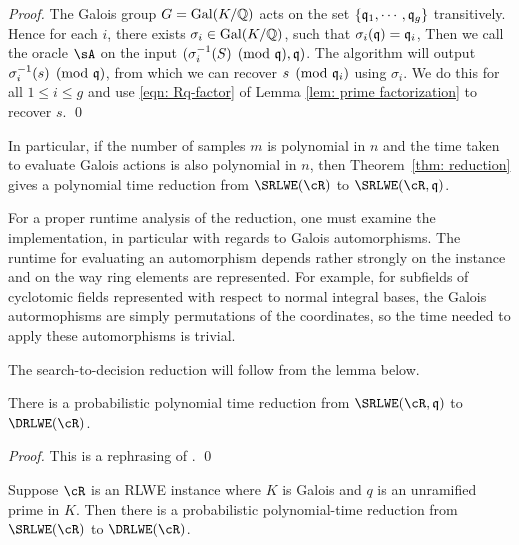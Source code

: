 \documentclass[envcountsect]{llncs}
\begin{document}
\begin{proof}
        The Galois group $G =\operatorname{Gal}(K/\mathbb{Q})$ acts on the set $\{\mathfrak{q}_1, \cdots ,\mathfrak{q}_g\}$ transitively. Hence for each $i$, there exists $\sigma_i \in \operatorname{Gal}(K/\mathbb{Q})$, such that $\sigma_i(\mathfrak{q}) = \mathfrak{q}_i$, Then we call the oracle $\sA$ on the input $(\sigma_i^{-1}(S) \pmod {\mathfrak{q}}, \mathfrak{q})$. The algorithm will output $\sigma_i^{-1}(s) \pmod{\mathfrak{q}}$, from which we can recover $s \pmod{\mathfrak{q}_i}$ using $\sigma_i$.  We do this for all $1\leq i \leq g$ and use \eqref{eqn: Rq-factor} of Lemma \ref{lem: prime factorization} to recover $s$. 
\qed \end{proof}

In particular, if the number of samples $m$ is polynomial in $n$ and the time taken to evaluate Galois actions is also polynomial in $n$, then Theorem~\ref{thm: reduction} gives a polynomial time reduction from $\SRLWE(\cR)$ to $\SRLWE(\cR,\fq)$. 

\begin{remark}
        For a proper runtime analysis of the reduction, one must examine the implementation, in particular with regards to Galois automorphisms.
The runtime for evaluating an automorphism depends
rather strongly on the instance and on the way ring elements are represented. For example, for subfields of cyclotomic fields represented with respect to normal integral bases, the Galois autormophisms are simply permutations of the coordinates, so the time needed to apply these automorphisms is trivial.
\end{remark}


The search-to-decision reduction will follow from the lemma below.
\begin{lemma}
There is a probabilistic polynomial time reduction from $\SRLWE(\cR,\fq)$ to $\DRLWE(\cR)$.
\end{lemma}

\begin{proof}
This is a rephrasing of \cite[Lemma 5.9 and Lemma 5.12]{lyubashevsky2013ideal}.
\qed \end{proof}

\begin{corollary}\label{cor: s-to-d}
Suppose $\cR$ is an RLWE instance where $K$ is Galois and $q$ is an unramified prime in $K$. Then there is a probabilistic polynomial-time reduction from $\SRLWE(\cR)$ to $\DRLWE(\cR)$.
\end{corollary}
\end{document}
